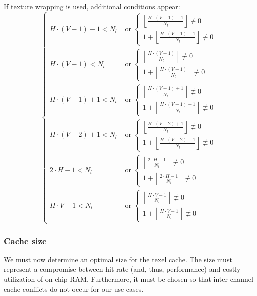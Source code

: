 \documentclass[a4paper,11pt]{kthesis}
\begin{document}
If texture wrapping is used, additional conditions appear:
\begin{equation}
\boxed{
\begin{cases}
H \cdot (V-1) - 1 < N_{l} & \textrm{ or } \begin{cases}
\left\lfloor \frac{H \cdot (V-1) - 1}{N_{l}} \right\rfloor \not \equiv 0 \\
1 + \left\lfloor \frac{H \cdot (V-1) - 1}{N_{l}} \right\rfloor \not \equiv 0
\end{cases} \\
H \cdot (V-1) < N_{l} & \textrm{ or } \begin{cases}
\left\lfloor \frac{H \cdot (V-1)}{N_{l}} \right\rfloor \not \equiv 0 \\
1 + \left\lfloor \frac{H \cdot (V-1)}{N_{l}} \right\rfloor \not \equiv 0
\end{cases} \\
H \cdot (V-1) + 1 < N_{l} & \textrm{ or } \begin{cases}
\left\lfloor \frac{H \cdot (V-1) + 1}{N_{l}} \right\rfloor \not \equiv 0 \\
1 + \left\lfloor \frac{H \cdot (V-1) + 1}{N_{l}} \right\rfloor \not \equiv 0
\end{cases} \\
H \cdot (V-2) + 1 < N_{l} & \textrm{ or } \begin{cases}
\left\lfloor \frac{H \cdot (V-2) + 1}{N_{l}} \right\rfloor \not \equiv 0 \\
1 + \left\lfloor \frac{H \cdot (V-2) + 1}{N_{l}} \right\rfloor \not \equiv 0
\end{cases} \\
2 \cdot H - 1 < N_{l} & \textrm{ or } \begin{cases}
\left\lfloor \frac{2 \cdot H - 1}{N_{l}} \right\rfloor \not \equiv 0 \\
1 + \left\lfloor \frac{2 \cdot H - 1}{N_{l}} \right\rfloor \not \equiv 0
\end{cases} \\
H \cdot V - 1 < N_{l} & \textrm{ or } \begin{cases}
\left\lfloor \frac{H \cdot V - 1}{N_{l}} \right\rfloor \not \equiv 0 \\
1 + \left\lfloor \frac{H \cdot V - 1}{N_{l}} \right\rfloor \not \equiv 0
\end{cases}
\end{cases}
}
\end{equation}

\subsubsection{Cache size}
We must now determine an optimal size for the texel cache. The size must represent a compromise between hit rate (and, thus, performance) and costly utilization of on-chip RAM. Furthermore, it must be chosen so that inter-channel cache conflicts do not occur for our use cases.
\end{document}
